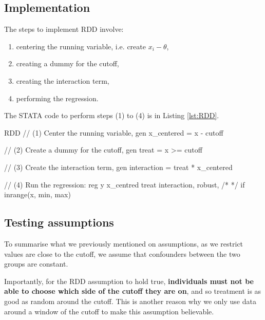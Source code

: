         \subsection{Implementation}
            The steps to implement RDD involve:
            \begin{enumerate}[(1)]
                \item centering the running variable, i.e. create $x_i-\theta$, 
                \item creating a dummy for the cutoff,
                \item creating the interaction term,
                \item performing the regression.
            \end{enumerate}
            The STATA code to perform steps (1) to (4) is in Listing \ref{lst:RDD}.
            \begin{sexylisting}[colback=white, label=lst:RDD/regression]{RDD}
//  (1) Center the running variable,
    gen x_centered = x - cutoff
    
//  (2) Create a dummy for the cutoff,
    gen treat = x >= cutoff
    
//  (3) Create the interaction term,
    gen interaction = treat * x_centered

//  (4) Run the regression:
    reg y x_centred treat interaction, robust, /*
    */  if inrange(x, min, max)
            \end{sexylisting}

        \subsection{Testing assumptions}
            To summarise what we previously mentioned on assumptions, as we restrict values are close to the cutoff, we assume that confounders between the two groups are constant.

            Importantly, for the RDD assumption to hold true, \textbf{individuals must not be able to choose which side of the cutoff they are on}, and so treatment is as good as random around the cutoff. This is another reason why we only use data around a window of the cutoff to make this assumption believable.

